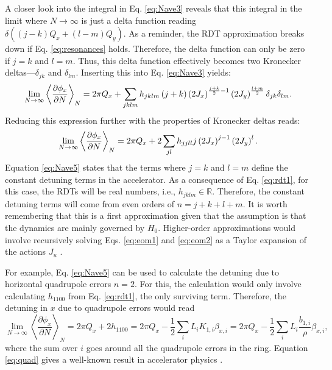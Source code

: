 A closer look into the integral in Eq. \ref{eq:Nave3} reveals that this integral in the limit where $N \rightarrow \infty$ is just a delta function reading $\delta\left( (j-k)Q_x+(l-m)Q_y\right)$. As a reminder, the RDT approximation breaks down if Eq. \ref{eq:resonances} holds. Therefore, the delta function can only be zero if $j=k$ and $l=m$. Thus, this delta function effectively becomes two Kronecker deltas---$\delta_{jk}$ and $\delta_{lm}$. Inserting this into Eq. \ref{eq:Nave3} yields:
\begin{equation}
    \label{eq:Nave4}
    \lim_{N\to\infty} \left\langle \frac{\partial \phi_x}{\partial N}\right\rangle _N = 2\pi Q_x\\
    +\sum_{jklm} h_{jklm} \left( j+k \right) \left( 2 J_x\right)^{\frac{j+k}{2}-1} \left( 2 J_y\right)^{\frac{l+m}{2}} \delta _{jk} \delta_{lm}.
\end{equation}
Reducing this expression further with the properties of Kronecker deltas reads:
\begin{equation}
    \label{eq:Nave5}
    \lim_{N\to\infty} \left\langle \frac{\partial \phi_x}{\partial N}\right\rangle _N = 2\pi Q_x\\
    +2\sum_{jl} h_{jjll} j \left( 2 J_x\right)^{j-1} \left( 2 J_y\right)^{l}.
\end{equation}
Equation \ref{eq:Nave5} states that the terms where $j=k$ and $l=m$ define the constant detuning terms in the accelerator. As a consequence of Eq. \ref{eq:rdt1}, for this case, the RDTs will be real numbers, i.e., $h_{jklm}\in \mathbb{R}$. Therefore, the constant detuning terms will come from even orders of $n=j+k+l+m$. It is worth remembering that this is a first approximation given that the assumption is that the dynamics are mainly governed by $H_0$. Higher-order approximations would involve recursively solving Eqs. \ref{eq:eom1} and \ref{eq:eom2} as a Taylor expansion of the actions $J_u$ \cite{higher}.

For example, Eq. \ref{eq:Nave5} can be used to calculate the detuning due to horizontal quadrupole errors $n=2$. For this, the calculation would only involve calculating $h_{1100}$ from Eq. \ref{eq:rdt1}, the only surviving term. Therefore, the detuning in $x$ due to quadrupole errors would read  
\begin{equation}
    \label{eq:quad}
    \lim_{N\to\infty} \left\langle \frac{\partial \phi_x}{\partial N}\right\rangle _N = 2\pi Q_x + 2h_{1100} = 2\pi Q_x - \frac{1}{2}\sum_i L_i K_{1,i} \beta_{x,i} = 2\pi Q_x - \frac{1}{2}\sum_i L_i \frac{b_{1,i}}{\rho} \beta_{x,i}, 
\end{equation}
where the sum over $i$ goes around all the quadrupole errors in the ring. Equation \ref{eq:quad} gives a well-known result in accelerator physics \cite{sylee}. 

